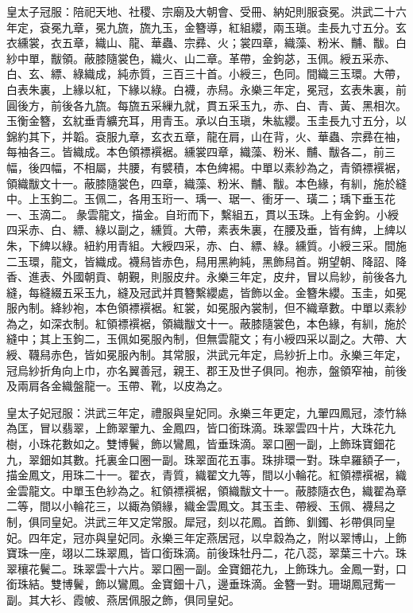 皇太子冠服：陪祀天地、社稷、宗廟及大朝會、受冊、納妃則服袞冕。洪武二十六年定，袞冕九章，冕九旒，旒九玉，金簪導，紅組纓，兩玉瑱。圭長九寸五分。玄衣纁裳，衣五章，織山、龍、華蟲、宗彞、火；裳四章，織藻、粉米、黼、黻。白紗中單，黻領。蔽膝隨裳色，織火、山二章。革帶，金鉤苾，玉佩。綬五采赤、白、玄、縹、綠織成，純赤質，三百三十首。小綬三，色同。間織三玉環。大帶，白表朱裏，上緣以紅，下緣以綠。白襪，赤舄。永樂三年定，冕冠，玄表朱裏，前圓後方，前後各九旒。每旒五采繅九就，貫五采玉九，赤、白、青、黃、黑相次。玉衡金簪，玄紞垂青纊充耳，用青玉。承以白玉瑱，朱紘纓。玉圭長九寸五分，以錦約其下，并韜。袞服九章，玄衣五章，龍在肩，山在背，火、華蟲、宗彞在袖，每袖各三。皆織成。本色領褾襈裾。纁裳四章，織藻、粉米、黼、黻各二，前三幅，後四幅，不相屬，共腰，有襞積，本色綼裼。中單以素紗為之，青領褾襈裾，領織黻文十一。蔽膝隨裳色，四章，織藻、粉米、黼、黻。本色緣，有紃，施於縫中。上玉鉤二。玉佩二，各用玉珩一、瑀一、琚一、衝牙一、璜二；瑀下垂玉花一、玉滴二。彖雲龍文，描金。自珩而下，繫組五，貫以玉珠。上有金鉤。小綬四采赤、白、縹、綠以副之，纁質。大帶，素表朱裏，在腰及垂，皆有綼，上綼以朱，下綼以綠。紐約用青組。大綬四采，赤、白、縹、綠。纁質。小綬三采。間施二玉環，龍文，皆織成。襪舄皆赤色，舄用黑絇純，黑飾舄首。朔望朝、降詔、降香、進表、外國朝貢、朝覲，則服皮弁。永樂三年定，皮弁，冒以烏紗，前後各九縫，每縫綴五采玉九，縫及冠武并貫簪繫纓處，皆飾以金。金簪朱纓。玉圭，如冕服內制。絳紗袍，本色領褾襈裾。紅裳，如冕服內裳制，但不織章數。中單以素紗為之，如深衣制。紅領褾襈裾，領織黻文十一。蔽膝隨裳色，本色緣，有紃，施於縫中；其上玉鉤二，玉佩如冕服內制，但無雲龍文；有小綬四采以副之。大帶、大綬、韈舄赤色，皆如冕服內制。其常服，洪武元年定，烏紗折上巾。永樂三年定，冠烏紗折角向上巾，亦名翼善冠，親王、郡王及世子俱同。袍赤，盤領窄袖，前後及兩肩各金織盤龍一。玉帶、靴，以皮為之。

皇太子妃冠服：洪武三年定，禮服與皇妃同。永樂三年更定，九翬四鳳冠，漆竹絲為匡，冒以翡翠，上飾翠翬九、金鳳四，皆口銜珠滴。珠翠雲四十片，大珠花九樹，小珠花數如之。雙博鬢，飾以鸞鳳，皆垂珠滴。翠口圈一副，上飾珠寶鈿花九，翠鈿如其數。托裏金口圈一副。珠翠面花五事。珠排環一對。珠皁羅額子一，描金鳳文，用珠二十一。翟衣，青質，織翟文九等，間以小輪花。紅領褾襈裾，織金雲龍文。中單玉色紗為之。紅領褾襈裾，領織黻文十一。蔽膝隨衣色，織翟為章二等，間以小輪花三，以緅為領緣，織金雲鳳文。其玉圭、帶綬、玉佩、襪舄之制，俱同皇妃。洪武三年又定常服。犀冠，刻以花鳳。首飾、釧鐲、衫帶俱同皇妃。四年定，冠亦與皇妃同。永樂三年定燕居冠，以皁縠為之，附以翠博山，上飾寶珠一座，翊以二珠翠鳳，皆口銜珠滴。前後珠牡丹二，花八蕊，翠葉三十六。珠翠穰花鬢二。珠翠雲十六片。翠口圈一副。金寶鈿花九，上飾珠九。金鳳一對，口銜珠結。雙博鬢，飾以鸞鳳。金寶鈿十八，邊垂珠滴。金簪一對。珊瑚鳳冠觜一副。其大衫、霞帔、燕居佩服之飾，俱同皇妃。

